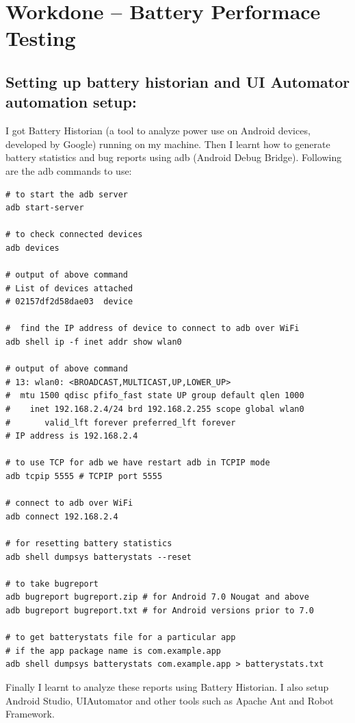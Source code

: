\setlength\parindent{0pt}

\chapter{Workdone -- Battery Performace Testing}

\section{Setting up battery historian and UI Automator automation setup:} I got Battery Historian (a tool to analyze power use on Android devices, developed by Google) running on my machine. Then I learnt how to generate battery statistics and bug reports using adb (Android Debug Bridge). Following are the adb commands to use:\cite{adb}
\begin{lstlisting}[style=ShellStyle]
# to start the adb server
adb start-server

# to check connected devices
adb devices

# output of above command
# List of devices attached
# 02157df2d58dae03	device

#  find the IP address of device to connect to adb over WiFi
adb shell ip -f inet addr show wlan0

# output of above command
# 13: wlan0: <BROADCAST,MULTICAST,UP,LOWER_UP> 
#  mtu 1500 qdisc pfifo_fast state UP group default qlen 1000
#    inet 192.168.2.4/24 brd 192.168.2.255 scope global wlan0
#       valid_lft forever preferred_lft forever
# IP address is 192.168.2.4

# to use TCP for adb we have restart adb in TCPIP mode
adb tcpip 5555 # TCPIP port 5555

# connect to adb over WiFi
adb connect 192.168.2.4

# for resetting battery statistics
adb shell dumpsys batterystats --reset

# to take bugreport
adb bugreport bugreport.zip # for Android 7.0 Nougat and above
adb bugreport bugreport.txt # for Android versions prior to 7.0 

# to get batterystats file for a particular app 
# if the app package name is com.example.app
adb shell dumpsys batterystats com.example.app > batterystats.txt
\end{lstlisting}
Finally I learnt to analyze these reports using Battery Historian. I also setup Android Studio, UIAutomator and other tools such as Apache Ant and Robot Framework.
\\


